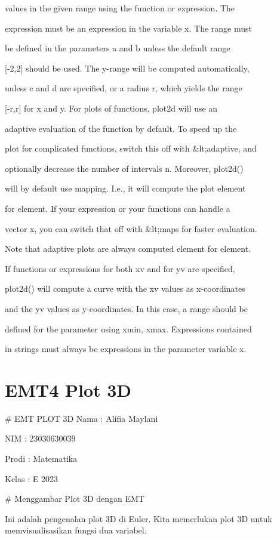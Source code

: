 \documentclass{article}
\begin{document}
values in the given range using the function or expression. The


expression must be an expression in the variable x. The range must


be defined in the parameters a and b unless the default range


[-2,2] should be used. The y-range will be computed automatically,


unless c and d are specified, or a radius r, which yields the range


[-r,r] for x and y. For plots of functions, plot2d will use an


adaptive evaluation of the function by default. To speed up the


plot for complicated functions, switch this off with &lt;adaptive, and


optionally decrease the number of intervals n. Moreover, plot2d()


will by default use mapping. I.e., it will compute the plot element


for element. If your expression or your functions can handle a


vector x, you can switch that off with &lt;maps for faster evaluation.


Note that adaptive plots are always computed element for element. 


If functions or expressions for both xv and for yv are specified,


plot2d() will compute a curve with the xv values as x-coordinates


and the yv values as y-coordinates. In this case, a range should be


defined for the parameter using xmin, xmax. Expressions contained


in strings must always be expressions in the parameter variable x.

\section{EMT4 Plot 3D}
# EMT PLOT 3D
Nama : Alifia Maylani


NIM : 23030630039


Prodi : Matematika


Kelas : E 2023


# Menggambar Plot 3D dengan EMT

Ini adalah pengenalan plot 3D di Euler. Kita memerlukan plot 3D untuk
memvisualisasikan fungsi dua variabel.
\end{document}
